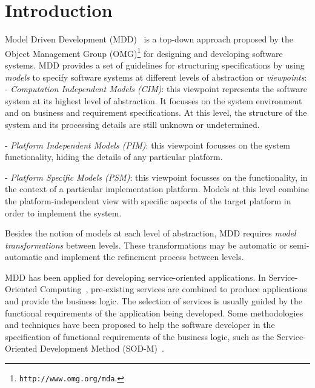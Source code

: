 \documentclass{llncs}
\theoremstyle{plain}
\theoremstyle{plain}
\theoremstyle{plain}
\begin{document}

\section{Introduction}
\label{sec:intro}
%
Model Driven Development (MDD)~\cite{Favre06arigorous} is a top-down approach proposed by the Object Management Group
(OMG)\footnote{\texttt{http://www.omg.org/mda}.} for designing and developing software systems. 
MDD provides a set of guidelines for  structuring  specifications by using \textit{models} to specify software systems at different levels of abstraction or \textit{viewpoints}:\\[1mm]
\noindent 
- \textit{Computation Independent Models (CIM)}: this viewpoint represents the software system at its highest level of abstraction. It focusses on the system
environment and on  business and requirement specifications. 
At this level, the structure of the system  and its processing details are still unknown or undetermined. 

\noindent 
- \textit{Platform Independent Models (PIM)}: this viewpoint focusses on the system functionality, hiding the details of any particular platform. 

\noindent 
- \textit{Platform Specific Models (PSM)}: this viewpoint focusses on the functionality, in the context of a particular implementation platform.
Models at this level combine the platform-independent view with specific aspects of the target platform in order to implement the system.  

Besides the notion of models at each level of abstraction, MDD requires  \textit{model transformations} between levels.
These transformations may be automatic or semi-automatic and implement the refinement process between levels. 

MDD has been applied for developing service-oriented applications.
In Service-Oriented Computing~\cite{scube2010book}, pre-existing services are
combined to produce applications and provide the business logic. The selection of services is usually guided by the functional requirements of the application being developed. 
Some methodologies and techniques have been proposed to help the software
developer in the specification of functional requirements of the business logic,
such as the Service-Oriented Development Method
(SOD-M)~\cite{decastro1}. 
\end{document}
